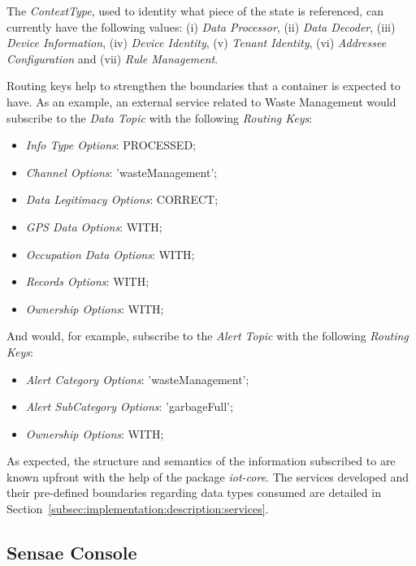 The \textit{ContextType}, used to identity what piece of the state is referenced, can currently have the following values: (i) \textit{Data Processor}, (ii) \textit{Data Decoder}, (iii) \textit{Device Information}, (iv) \textit{Device Identity}, (v) \textit{Tenant Identity}, (vi) \textit{Addressee Configuration} and (vii) \textit{Rule Management}.

Routing keys help to strengthen the boundaries that a container is expected to have. As an example, an external service related to Waste Management would subscribe to the \textit{Data Topic} with the following \textit{Routing Keys}:

\begin{itemize}
   \item \textit{Info Type Options}: PROCESSED;
   \item \textit{Channel Options}: 'wasteManagement';
   \item \textit{Data Legitimacy Options}: CORRECT;
   \item \textit{GPS Data Options}: WITH;
   \item \textit{Occupation Data Options}: WITH;
   \item \textit{Records Options}: WITH;
   \item \textit{Ownership Options}: WITH;
\end{itemize}

And would, for example, subscribe to the \textit{Alert Topic} with the following \textit{Routing Keys}:

\begin{itemize}
   \item \textit{Alert Category Options}: 'wasteManagement';
   \item \textit{Alert SubCategory Options}: 'garbageFull';
   \item \textit{Ownership Options}: WITH;
\end{itemize}

As expected, the structure and semantics of the information subscribed to are known upfront with the help of the package \textit{iot-core}. The services developed and their pre-defined boundaries regarding data types consumed are detailed in Section~\ref{subsec:implementation:description:services}.

\subsection{Sensae Console}
\label{subsec:design:domain:bounded_contexts}

